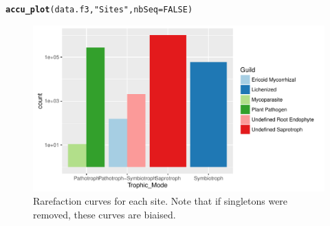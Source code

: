 \documentclass[12pt]{article}\usepackage[]{graphicx}\usepackage[]{color}
\makeatletter
\def\maxwidth{ %
  \ifdim\Gin@nat@width>\linewidth
    \linewidth
  \else
    \Gin@nat@width
  \fi
}
\newcommand{\hlnum}[1]{\textcolor[rgb]{0.686,0.059,0.569}{#1}}%
\newcommand{\hlstr}[1]{\textcolor[rgb]{0.192,0.494,0.8}{#1}}%
\newcommand{\hlstd}[1]{\textcolor[rgb]{0.345,0.345,0.345}{#1}}%
\newcommand{\hlkwc}[1]{\textcolor[rgb]{0.333,0.667,0.333}{#1}}%
\newcommand{\hlkwd}[1]{\textcolor[rgb]{0.737,0.353,0.396}{\textbf{#1}}}%
\newenvironment{kframe}{%
 \def\at@end@of@kframe{}%
 \ifinner\ifhmode%
  \def\at@end@of@kframe{\end{minipage}}%
  \begin{minipage}{\columnwidth}%
 \fi\fi%
 \def\FrameCommand##1{\hskip\@totalleftmargin \hskip-\fboxsep
 \colorbox{shadecolor}{##1}\hskip-\fboxsep
     \hskip-\linewidth \hskip-\@totalleftmargin \hskip\columnwidth}%
 \MakeFramed {\advance\hsize-\width
   \@totalleftmargin\z@ \linewidth\hsize
   \@setminipage}}%
 {\par\unskip\endMakeFramed%
 \at@end@of@kframe}
\newenvironment{knitrout}{}{} %
\numberwithin{figure}{section}
\makeatother
\begin{document}
\begin{knitrout}\small
{}\color{fgcolor}\begin{kframe}
\begin{alltt}
\hlkwd{accu_plot}\hlstd{(data.f3,} \hlstr{"Sites"}\hlstd{,} \hlkwc{nbSeq} \hlstd{=} \hlnum{FALSE}\hlstd{)}
\end{alltt}
\end{kframe}\begin{figure}

{\centering \includegraphics[width=\maxwidth]{figure/unnamed-chunk-34-1} 

}

\caption[Rarefaction curves for each site]{Rarefaction curves for each site. Note that if singletons were removed, these curves are biaised.}\label{fig:unnamed-chunk-34}
\end{figure}


\end{knitrout}
\end{document}
